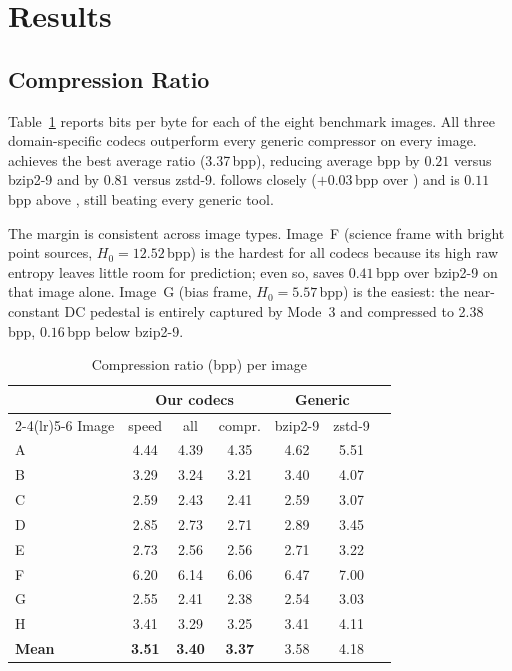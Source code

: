 \section{Results}
\label{sec:results}

\subsection{Compression Ratio}

Table~\ref{tab:bpp} reports bits per byte for each of the eight benchmark
images. All three domain-specific codecs outperform every generic compressor
on every image. \cmpfocused{} achieves the best average ratio
(3.37\,bpp), reducing average bpp by $0.21$ versus bzip2-9 and by $0.81$
versus zstd-9. \allrounder{} follows closely ($+0.03$\,bpp over
\cmpfocused{}) and \spdfocused{} is $0.11$\,bpp above \allrounder{},
still beating every generic tool.

The margin is consistent across image types. Image~F (science frame with
bright point sources, $H_0 = 12.52$\,bpp) is the hardest for all codecs
because its high raw entropy leaves little room for prediction; even so,
\cmpfocused{} saves $0.41$\,bpp over bzip2-9 on that image alone.
Image~G (bias frame, $H_0 = 5.57$\,bpp) is the easiest: the near-constant
DC pedestal is entirely captured by Mode~3 and compressed to 2.38\,bpp,
$0.16$\,bpp below bzip2-9.

\begin{table}[H]
\centering
\caption{Compression ratio (bpp) per image}
\label{tab:bpp}
\scriptsize
\begin{tabular}{lcccccc}
\toprule
 & \multicolumn{3}{c}{\textbf{Our codecs}} & \multicolumn{2}{c}{Generic} \\
\cmidrule(lr){2-4}\cmidrule(lr){5-6}
Image & speed & all & compr. & bzip2-9 & zstd-9 \\
\midrule
A & 4.44 & 4.39 & 4.35 & 4.62 & 5.51 \\
B & 3.29 & 3.24 & 3.21 & 3.40 & 4.07 \\
C & 2.59 & 2.43 & 2.41 & 2.59 & 3.07 \\
D & 2.85 & 2.73 & 2.71 & 2.89 & 3.45 \\
E & 2.73 & 2.56 & 2.56 & 2.71 & 3.22 \\
F & 6.20 & 6.14 & 6.06 & 6.47 & 7.00 \\
G & 2.55 & 2.41 & 2.38 & 2.54 & 3.03 \\
H & 3.41 & 3.29 & 3.25 & 3.41 & 4.11 \\
\midrule
\textbf{Mean} & \textbf{3.51} & \textbf{3.40} & \textbf{3.37} & 3.58 & 4.18 \\
\bottomrule
\end{tabular}
\end{table}

